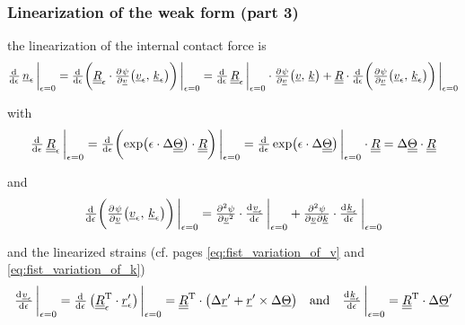 \begin{frame}
  \frametitle{Linearization of the weak form (part 3)}

  the linearization of the internal contact force is
  \begin{displaymath}
    \od{}{\epsilon} \, \underline{n}_{\epsilon} \sVert[3]_{\epsilon=0} = 
    \od{}{\epsilon} \biggl(
      \doubleunderline{R}_{\epsilon} \cdot \pd{\psi}{\underline{v}} \bigl( \underline{v}_{\epsilon}, \, \underline{k}_{\epsilon} \bigr)
    \biggr) \sVert[3]_{\epsilon=0} =
    \od{}{\epsilon} \, \doubleunderline{R}_{\epsilon} \sVert[3]_{\epsilon=0} \cdot \pd{\psi}{\underline{v}} \bigl( \underline{v}, \, \underline{k} \bigr) +
    \doubleunderline{R} \cdot \od{}{\epsilon} \biggl( \pd{\psi}{\underline{v}} \bigl( \underline{v}_{\epsilon}, \, \underline{k}_{\epsilon} \bigr) \biggr) \sVert[3]_{\epsilon=0}
  \end{displaymath}
  
  \vspace{1em}
  with
  \begin{displaymath}
    \od{}{\epsilon} \, \doubleunderline{R}_{\epsilon} \sVert[3]_{\epsilon=0} =
    \od{}{\epsilon} \biggl( \exp \bigl( \epsilon \cdot \Delta \doubleunderline{\Theta} \bigr) \cdot \doubleunderline{R} \biggr) \sVert[3]_{\epsilon=0} =
    \od{}{\epsilon} \exp \bigl( \epsilon \cdot \Delta \doubleunderline{\Theta} \bigr) \sVert[3]_{\epsilon=0} \cdot \doubleunderline{R} =
    \Delta \doubleunderline{\Theta} \cdot \doubleunderline{R}
  \end{displaymath}
  
  \vspace{1em}
  and
  \begin{displaymath}
    \od{}{\epsilon} \biggl( \pd{\psi}{\underline{v}} \bigl( \underline{v}_{\epsilon}, \, \underline{k}_{\epsilon} \bigr) \biggr) \sVert[3]_{\epsilon=0} =
    \pd[2]{\psi}{\underline{v}} \cdot \od{\underline{v}_{\epsilon}}{\epsilon} \sVert[3]_{\epsilon=0}
     + \md{\psi}{2}{\underline{v}}{}{\underline{k}}{} \cdot \od{\underline{k}_{\epsilon}}{\epsilon} \sVert[3]_{\epsilon=0}
  \end{displaymath}
  
  \vspace{0.5em}
  and the linearized strains (cf. pages \autoref{eq:fist_variation_of_v} and \autoref{eq:fist_variation_of_k})
  \begin{displaymath}
    \od{\underline{v}_{\epsilon}}{\epsilon} \sVert[3]_{\epsilon=0} =
    \od{}{\epsilon} \, \bigl( \doubleunderline{R}_{\epsilon}^{\mathrm{T}} \cdot \underline{r}_{\epsilon}^{\prime} \bigr) \sVert[3]_{\epsilon=0} =
    \doubleunderline{R}^{\mathrm{T}} \cdot \bigl( \Delta \underline{r}^{\prime} + \underline{r}^{\prime} \times \Delta \underline{\Theta} \bigr)
    \quad \text{and} \quad
    \od{\underline{k}_{\epsilon}}{\epsilon} \sVert[3]_{\epsilon=0} =
    \doubleunderline{R}^{\mathrm{T}} \cdot \Delta \underline{\Theta}^{\prime}
  \end{displaymath}
  
\end{frame}


